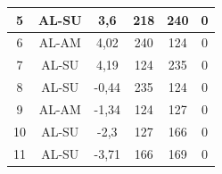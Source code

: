 \begin{table}[H]
\begin{tabular}{|c|c|c|c|c|c|}
5           & AL-SU            & 3,6                                                                      & 218                                                                      & 240                                                                       & 0                                                                              \\ \hline
6           & AL-AM            & 4,02                                                                     & 240                                                                      & 124                                                                       & 0                                                                              \\ \hline
7           & AL-SU            & 4,19                                                                     & 124                                                                      & 235                                                                       & 0                                                                              \\ \hline
8           & AL-SU            & -0,44                                                                    & 235                                                                      & 124                                                                       & 0                                                                              \\ \hline
9           & AL-AM            & -1,34                                                                    & 124                                                                      & 127                                                                       & 0                                                                              \\ \hline
10          & AL-SU            & -2,3                                                                     & 127                                                                      & 166                                                                       & 0                                                                              \\ \hline
11          & AL-SU            & -3,71                                                                    & 166                                                                      & 169                                                                       & 0                                                                              \\ \hline

\end{tabular}
\end{table}
